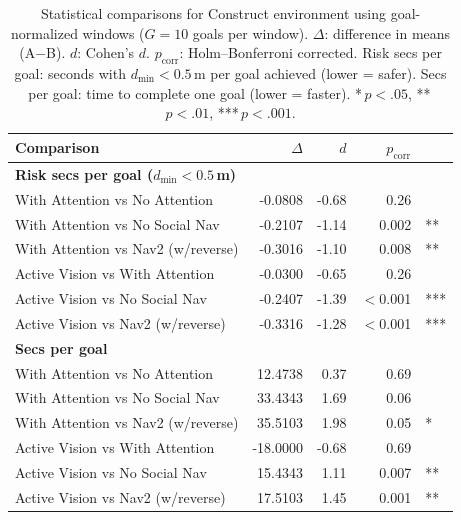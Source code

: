 \begin{table}[h]
\centering
\small
\begin{tabular}{lrrrl}
\toprule
\textbf{Comparison} & \textbf{$\Delta$} & \textbf{$d$} & \textbf{$p_{\mathrm{corr}}$} & \\
\midrule
\multicolumn{5}{l}{\textbf{Risk secs per goal ($d_{\min} < 0.5$\,m)}} \\
\quad With Attention vs No Attention & -0.0808 & -0.68 & 0.26 &  \\
\quad With Attention vs No Social Nav & -0.2107 & -1.14 & 0.002 & ** \\
\quad With Attention vs Nav2 (w/reverse) & -0.3016 & -1.10 & 0.008 & ** \\
\quad Active Vision vs With Attention & -0.0300 & -0.65 & 0.26 &  \\
\quad Active Vision vs No Social Nav & -0.2407 & -1.39 & $<$0.001 & *** \\
\quad Active Vision vs Nav2 (w/reverse) & -0.3316 & -1.28 & $<$0.001 & *** \\
\midrule
\multicolumn{5}{l}{\textbf{Secs per goal}} \\
\quad With Attention vs No Attention & 12.4738 & 0.37 & 0.69 &  \\
\quad With Attention vs No Social Nav & 33.4343 & 1.69 & 0.06 &  \\
\quad With Attention vs Nav2 (w/reverse) & 35.5103 & 1.98 & 0.05 & * \\
\quad Active Vision vs With Attention & -18.0000 & -0.68 & 0.69 &  \\
\quad Active Vision vs No Social Nav & 15.4343 & 1.11 & 0.007 & ** \\
\quad Active Vision vs Nav2 (w/reverse) & 17.5103 & 1.45 & 0.001 & ** \\
\bottomrule
\end{tabular}
\caption{Statistical comparisons for Construct environment using goal-normalized windows ($G = 10$ goals per window). $\Delta$: difference in means (A$-$B). $d$: Cohen's $d$. $p_{\mathrm{corr}}$: Holm--Bonferroni corrected. Risk secs per goal: seconds with $d_{\min} < 0.5$\,m per goal achieved (lower = safer). Secs per goal: time to complete one goal (lower = faster). *\,$p < .05$, **\,$p < .01$, ***\,$p < .001$.}
\label{tab:stats_construct}
\end{table}